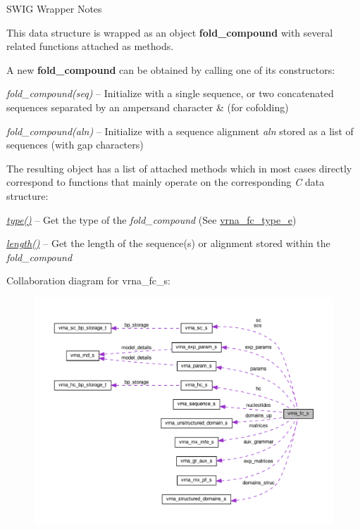 \begin{DoxyRefDesc}{S\+W\+I\+G Wrapper Notes}
\item[\hyperlink{wrappers__wrappers000067}{S\+W\+I\+G Wrapper Notes}]

This data structure is wrapped as an object {\bfseries fold\+\_\+compound} with several related functions attached as methods.

A new {\bfseries fold\+\_\+compound} can be obtained by calling one of its constructors\+:~\newline

\begin{DoxyItemize}
\item {\itshape fold\+\_\+compound(seq)} -- Initialize with a single sequence, or two concatenated sequences separated by an ampersand character \textquotesingle{}\&\textquotesingle{} (for cofolding)
\item {\itshape fold\+\_\+compound(aln)} -- Initialize with a sequence alignment {\itshape aln} stored as a list of sequences (with gap characters)
\end{DoxyItemize}The resulting object has a list of attached methods which in most cases directly correspond to functions that mainly operate on the corresponding {\itshape C} data structure\+:~\newline

\begin{DoxyItemize}
\item {\itshape \hyperlink{group__fold__compound_ac5eab693deac9a1a40c2a95ac294707c}{type()}} -- Get the type of the {\itshape fold\+\_\+compound} (See \hyperlink{group__fold__compound_ga01a4ff86fa71deaaa5d1abbd95a1447d}{vrna\+\_\+fc\+\_\+type\+\_\+e})
\item {\itshape \hyperlink{group__fold__compound_a95fbfed770b858e50c766505dc4bf998}{length()}} -- Get the length of the sequence(s) or alignment stored within the {\itshape fold\+\_\+compound} 
\end{DoxyItemize}\end{DoxyRefDesc}


Collaboration diagram for vrna\+\_\+fc\+\_\+s\+:
\nopagebreak
\begin{figure}[H]
\begin{center}
\leavevmode
\includegraphics[width=350pt]{structvrna__fc__s__coll__graph}
\end{center}
\end{figure}
